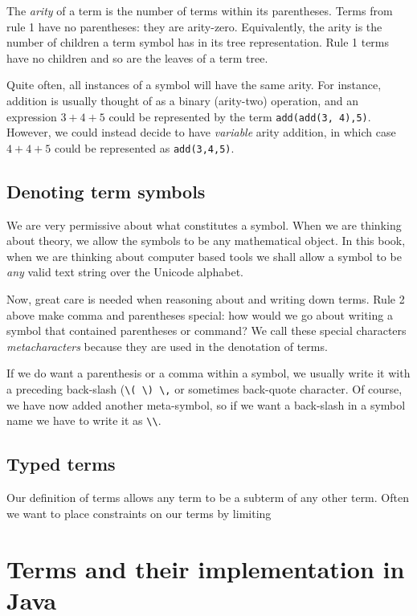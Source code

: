 The {\em arity} of a term is the number of terms within its
parentheses. Terms from rule 1 have no parentheses: they are
arity-zero. Equivalently, the arity is the number of children a term
symbol has in its tree representation. Rule 1 terms have no children
and so are the leaves of a term tree.

Quite often, all instances of a symbol will have the same arity. For instance, addition is usually thought of as a binary (arity-two) operation, and an expression $3+4+5$ could be represented by the term \verb+add(add(3, 4),5)+. However, we could instead decide to have {\em variable} arity addition, in which case $4+4+5$ could be represented as \verb+add(3,4,5)+.


\subsection{Denoting term symbols}

We are very permissive about what constitutes a symbol. When we are thinking about theory, we allow the symbols to be any mathematical object. In this book, when we are thinking about computer based tools we shall allow a symbol to be {\em any} valid text string over the Unicode alphabet.

Now, great care is needed when reasoning about and writing down terms. Rule 2 above make comma and parentheses special: how would we go about writing a symbol that contained parentheses or command? We call these special characters {\em metacharacters} because they are used in the denotation of terms.
 
If we do want a parenthesis or a comma within a symbol, we usually write it with a
preceding back-slash (\verb+\( \) \,+ or sometimes back-quote
character. Of course, we have now added another meta-symbol, so if we
want a back-slash in a symbol name we have to write it as \verb+\\+.


\subsection{Typed terms}
Our definition of terms allows any term to be a subterm of any other term. Often we want to place constraints on our terms by limiting 
\section{Terms and their implementation in Java}
\label{TermsAndImplementation}
\newcommand{\str}{\mbox{\em Str}}
\newcommand{\nat}{\mbox{\em Nat}}
\newcommand{\obj}{\mbox{\em Obj}}

